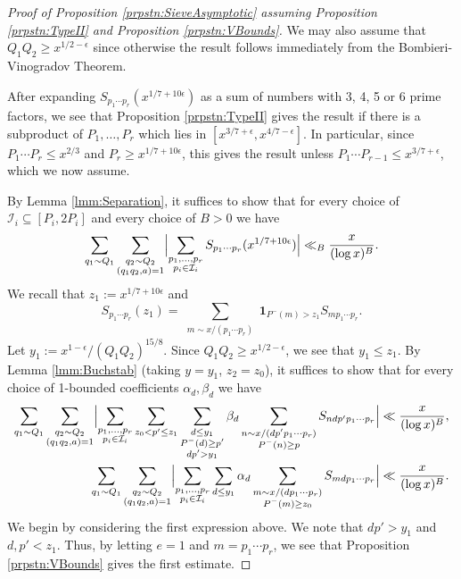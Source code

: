\documentclass[10pt]{amsart}
\theoremstyle{plain}
\numberwithin{equation}{section}
\begin{document}
\begin{proof}[Proof of Proposition \ref{prpstn:SieveAsymptotic} assuming Proposition \ref{prpstn:TypeII} and Proposition \ref{prpstn:VBounds}]
 We may also assume that $Q_1Q_2\ge x^{1/2-\epsilon}$ since otherwise the result follows immediately from the Bombieri-Vinogradov Theorem.

After expanding $S_{p_1\cdots p_r}(x^{1/7+10\epsilon})$ as a sum of numbers with 3, 4, 5 or 6 prime factors, we see that Proposition \ref{prpstn:TypeII} gives the result if there is a subproduct of $P_1,\dots,P_r$ which lies in $[x^{3/7+\epsilon},x^{4/7-\epsilon}]$. In particular, since $P_1\cdots P_r\le x^{2/3}$ and $P_r\ge x^{1/7+10\epsilon}$, this gives the result unless $P_1\cdots P_{r-1}\le x^{3/7+\epsilon}$, which we now assume.

By Lemma \ref{lmm:Separation}, it suffices to show that for every choice of $\mathcal{I}_i\subseteq[P_i,2P_i]$ and every choice of $B>0$ we have
\[
\sum_{q_1\sim Q_1}\sum_{\substack{ q_2\sim Q_2\\ (q_1q_2,a)=1}} \Bigl|\sum_{\substack{p_1,\dots,p_r\\ p_i\in \mathcal{I}_i}}S_{p_1\cdots p_r}(x^{1/7+10\epsilon})\Bigr|\ll_{B}\frac{x}{(\log{x})^B}.
\]
We recall that $z_1:=x^{1/7+10\epsilon}$ and 
\[
S_{p_1\cdots p_r}(z_1)=\sum_{\substack{m\sim x/(p_1\cdots p_r)}}\mathbf{1}_{P^-(m)>z_1}S_{mp_1\cdots p_r}.
\]
Let $y_1:=x^{1-\epsilon}/(Q_1Q_2)^{15/8}$. Since $Q_1Q_2\ge x^{1/2-\epsilon}$, we see that $y_1\le z_1$. By Lemma \ref{lmm:Buchstab} (taking $y=y_1$, $z_2=z_0$), it suffices to show that for every choice of 1-bounded coefficients $\alpha_d,\beta_d$ we have
\begin{align*}
\sum_{q_1\sim Q_1}\sum_{\substack{ q_2\sim Q_2\\ (q_1q_2,a)=1}} \Bigl|\sum_{\substack{p_1,\dots,p_r\\ p_i\in \mathcal{I}_i}}\sum_{z_0<p'\le z_1}\sum_{\substack{d\le y_1\\ P^-(d)\ge p'\\ d p'>y_1}}\beta_d\sum_{\substack{n\sim x/(d p' p_1\cdots p_r)\\ P^-(n)\ge p}}S_{n d p' p_1\cdots p_r}\Bigr|\ll \frac{x}{(\log{x})^B},\\
\sum_{q_1\sim Q_1}\sum_{\substack{ q_2\sim Q_2\\ (q_1q_2,a)=1}}\Bigl|\sum_{\substack{p_1,\dots,p_r\\ p_i\in \mathcal{I}_i}}\sum_{d\le y_1}\alpha_d\sum_{\substack{m\sim x/(d p_1\cdots p_r)\\ P^-(m)\ge z_0}}S_{m d p_1\cdots p_r}\Bigr|\ll \frac{x}{(\log{x})^B}.
\end{align*}
We begin by considering the first expression above. We note that $d p'>y_1$ and $d,p'<z_1$. Thus, by letting $e=1$ and $m=p_1\cdots p_r$, we see that Proposition \ref{prpstn:VBounds} gives the first estimate.


\end{proof}
\end{document}
